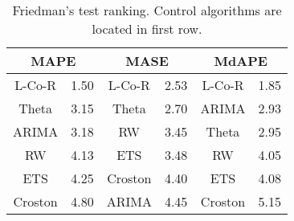 \documentclass[a4paper,twoside]{article}
\newcommand{\metodo}{L-Co-R}
\begin{document}
\begin{itemize}
    \begin{table}[h]
        \caption{Friedman's test ranking. Control algorithms are located in first row.}
        \label{tab:ranking}
        \centering
        \begin{tabular}{|c|c|c|c|c|c|}
         \hline \multicolumn{2}{|c|}{MAPE}   &  \multicolumn{2}{c|}{MASE}  &   \multicolumn{2}{c|}{MdAPE} \\
         \hline {\metodo} & 1.50   &   {\metodo} & 2.53   &   {\metodo} & 1.85 \\
         \hline Theta	&	3.15   &	Theta   &   2.70   &   ARIMA   &   2.93\\
         \hline ARIMA	&	3.18   &	RW      &   3.45   &   Theta   &   2.95\\
         \hline RW      &   4.13   &   ETS     &   3.48   &   RW      &   4.05\\
         \hline ETS     &   4.25   &   Croston &   4.40   &   ETS     &   4.08\\
         \hline Croston &   4.80   &   ARIMA   &   4.45   &   Croston &   5.15\\
         \hline
        \end{tabular}
    \end{table}


\end{itemize}
\end{document}
